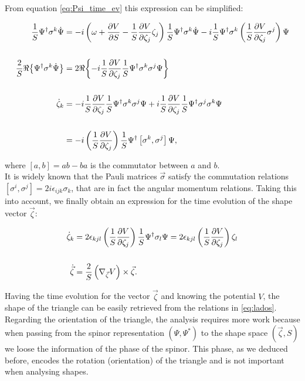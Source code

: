 From equation \eqref{eq:Psi_time_ev} this expression can be simplified:

\begin{align*}
\frac{1}{S}\Psi^{\dagger}\sigma^k\dot{\Psi} &= -i\left( \omega +\frac{\partial V}{\partial S}- \frac{1}{S}\frac{\partial V}{\partial \zeta_j}\zeta_j  \right)\frac{1}{S}\Psi^{\dagger}\sigma^k\dot{\Psi} -i\frac{1}{S}\Psi^{\dagger}\sigma^k\left( \frac{1}{S}\frac{\partial V}{\partial \zeta_j}\sigma^j \right)\Psi\\
\\
\frac{2}{S}\Re{\left\{\Psi^{\dagger}\sigma^k\dot{\Psi}\right\}} &= 2\Re{\left\{-i\frac{1}{S}\frac{\partial V}{\partial \zeta_j}\frac{1}{S}\Psi^{\dagger}\sigma^k\sigma^j\Psi\right\}}\\
\\
\dot{\zeta}_k &= -i\frac{1}{S}\frac{\partial V}{\partial \zeta_j}\frac{1}{S}\Psi^{\dagger}\sigma^k\sigma^j\Psi +i\frac{1}{S}\frac{\partial V}{\partial \zeta_j}\frac{1}{S}\Psi^{\dagger}\sigma^j\sigma^k\Psi\\
\\
&= -i\left( \frac{1}{S}\frac{\partial V}{\partial \zeta_j} \right)\frac{1}{S}\Psi^{\dagger}\left[\sigma^k,\sigma^j\right]\Psi,
\end{align*}

where $[a,b] = ab-ba$ is the commutator between $a$ and $b$. \\

It is widely known that the Pauli matrices $\vec{\sigma}$ satisfy the commutation relations $[\sigma^i,\sigma^j] = 2i\epsilon_{ijk}\sigma_k$, that are in fact  the angular momentum relations. Taking this into account, we finally obtain an expression for the time evolution of the shape vector $\vec{\zeta}$:

\begin{align}
\dot{\zeta}_k &= 2\epsilon_{kjl}\left( \frac{1}{S}\frac{\partial V}{\partial \zeta_j} \right)\frac{1}{S}\Psi^{\dagger}\sigma_l\Psi =  2\epsilon_{kjl}\left( \frac{1}{S}\frac{\partial V}{\partial \zeta_j} \right)\zeta_l \nonumber \\ 
\nonumber \\ 
\dot{\vec{\zeta}} &= \frac{2}{S}\left( \nabla_{\vec{\zeta}}V \right)\times\vec{\zeta}. 
\end{align}

Having the time evolution for the vector $\vec{\zeta}$ and knowing the potential $V$, the shape of the triangle can be easily retrieved from the relations in \eqref{eq:lados}. Regarding the orientation of the triangle, the analysis requires more work because when passing from the spinor representation $(\Psi,\Psi^*)$ to the shape space $(\vec{\zeta},S)$ we loose the information of the phase of the spinor. This phase, as we deduced before, encodes the rotation (orientation) of the triangle and is not important when analysing shapes.\\

